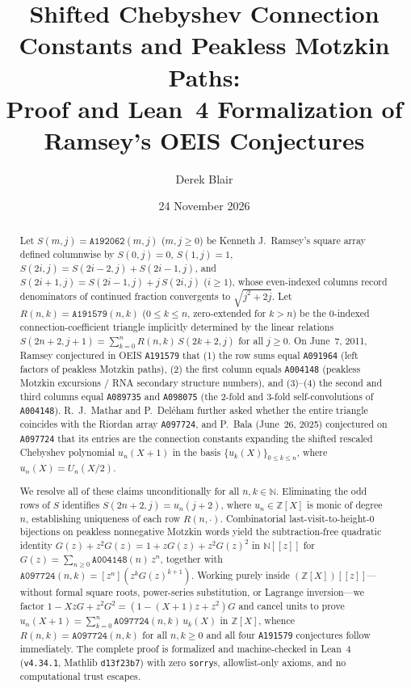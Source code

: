 \documentclass[11pt]{article}
\title{Shifted Chebyshev Connection Constants and Peakless Motzkin Paths:\\[2pt]
\large Proof and Lean~4 Formalization of Ramsey's OEIS \seq{A191579} Conjectures}
\author{Derek Blair}
\date{24 November 2026}
\newcommand{\llbracket}{[\![}
\newcommand{\rrbracket}{]\!]}
\theoremstyle{definition}
\newcommand{\N}{\mathbb{N}}
\newcommand{\Z}{\mathbb{Z}}
\newcommand{\seq}[1]{\texttt{#1}}
\begin{document}
\maketitle

\begin{abstract}
Let $S(m, j) = \seq{A192062}(m, j)$ ($m, j \ge 0$) be Kenneth J.\ Ramsey's square array defined columnwise by $S(0, j) = 0$, $S(1, j) = 1$, $S(2i, j) = S(2i - 2, j) + S(2i - 1, j)$, and $S(2i + 1, j) = S(2i - 1, j) + j\,S(2i, j)$ ($i \ge 1$), whose even-indexed columns record denominators of continued fraction convergents to $\sqrt{j^2 + 2j}$. Let $R(n, k) = \seq{A191579}(n, k)$ ($0 \le k \le n$, zero-extended for $k > n$) be the $0$-indexed connection-coefficient triangle implicitly determined by the linear relations $S(2n + 2, j + 1) = \sum_{k=0}^{n} R(n, k)\,S(2k + 2, j)$ for all $j \ge 0$. On June~7, 2011, Ramsey conjectured in OEIS \seq{A191579} that (1) the row sums equal \seq{A091964} (left factors of peakless Motzkin paths), (2) the first column equals \seq{A004148} (peakless Motzkin excursions / RNA secondary structure numbers), and (3)--(4) the second and third columns equal \seq{A089735} and \seq{A098075} (the $2$-fold and $3$-fold self-convolutions of \seq{A004148}). R.~J.\ Mathar and P.\ Del\'eham further asked whether the entire triangle coincides with the Riordan array \seq{A097724}, and P.\ Bala (June~26, 2025) conjectured on \seq{A097724} that its entries are the connection constants expanding the shifted rescaled Chebyshev polynomial $u_n(X + 1)$ in the basis $\{u_k(X)\}_{0 \le k \le n}$, where $u_n(X) = U_n(X/2)$.

We resolve all of these claims unconditionally for all $n, k \in \N$. Eliminating the odd rows of $S$ identifies $S(2n + 2, j) = u_n(j + 2)$, where $u_n \in \Z[X]$ is monic of degree $n$, establishing uniqueness of each row $R(n, \cdot)$. Combinatorial last-visit-to-height-$0$ bijections on peakless nonnegative Motzkin words yield the subtraction-free quadratic identity $G(z) + z^2 G(z) = 1 + z G(z) + z^2 G(z)^2$ in $\N\llbracket z \rrbracket$ for $G(z) = \sum_{n \ge 0} \seq{A004148}(n)\,z^n$, together with $\seq{A097724}(n, k) = [z^n](z^k G(z)^{k+1})$. Working purely inside $(\Z[X])\llbracket z \rrbracket$---without formal square roots, power-series substitution, or Lagrange inversion---we factor $1 - X z G + z^2 G^2 = (1 - (X+1)z + z^2)G$ and cancel units to prove $u_n(X + 1) = \sum_{k=0}^n \seq{A097724}(n, k)\,u_k(X)$ in $\Z[X]$, whence $R(n, k) = \seq{A097724}(n, k)$ for all $n, k \ge 0$ and all four \seq{A191579} conjectures follow immediately. The complete proof is formalized and machine-checked in Lean~4 (\texttt{v4.34.1}, Mathlib \texttt{d13f23b7}) with zero \texttt{sorry}s, allowlist-only axioms, and no computational trust escapes.
\end{abstract}
\end{document}
